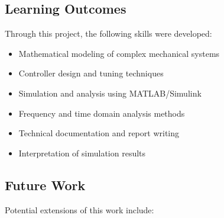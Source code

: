 \documentclass[12pt,a4paper]{article}
\begin{document}
\subsection{Learning Outcomes}

Through this project, the following skills were developed:
\begin{itemize}
    \item Mathematical modeling of complex mechanical systems
    \item Controller design and tuning techniques
    \item Simulation and analysis using MATLAB/Simulink
    \item Frequency and time domain analysis methods
    \item Technical documentation and report writing
    \item Interpretation of simulation results
\end{itemize}

\subsection{Future Work}

Potential extensions of this work include:
\end{document}
